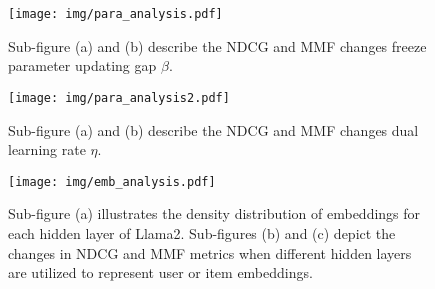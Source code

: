\begin{figure}
    \centering
    \texttt{[image: img/para\_analysis.pdf]}
    \caption{Sub-figure (a) and (b) describe the NDCG and MMF changes \wrt freeze parameter updating gap $\beta$. }
    \label{fig:para_analysis}
\end{figure}

\begin{figure}
    \centering
    \texttt{[image: img/para\_analysis2.pdf]}
    \caption{Sub-figure (a) and (b) describe the NDCG and MMF changes \wrt dual learning rate $\eta$.}
    \label{fig:para_analysis2}
\end{figure}

\begin{figure}
    \centering
    \texttt{[image: img/emb\_analysis.pdf]}
    \caption{Sub-figure (a) illustrates the density distribution of embeddings for each hidden layer of Llama2. Sub-figures (b) and (c) depict the changes in NDCG and MMF metrics when different hidden layers are utilized to represent user or item embeddings. }
    \label{fig:emb_analysis}
\end{figure}

\begin{table}[t]
\centering
\small
\caption{We conduct empirical experiments to show the effect of the length of item-clicked sequences. The experiments are conducted on the MIND dataset under BigRec backbones. }
\label{tab:history_length}
\end{table}


